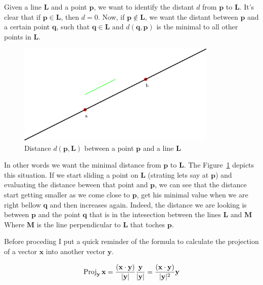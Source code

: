 Given a line $\mathbf{L}$ and a point $\mathbf{p}$, we want to identify the distant $d$ from $\mathbf{p}$ to $\mathbf{L}$.
It's clear that if $\mathbf{p} \in \mathbf{L}$, then $d = 0$.
Now, if $\mathbf{p} \notin \mathbf{L}$, we want the distant between $\mathbf{p}$ and a certain point $\mathbf{q}$, such that $\mathbf{q} \in \mathbf{L}$ and $d(\mathbf{q}, \mathbf{p})$ is the minimal to all other points in $\mathbf{L}$.

\begin{figure}[htb]
  \centering
  \includegraphics[width=0.85\textwidth]{img/line}
  \caption{Distance $d(\mathbf{p}, \mathbf{L})$ between a point $\mathbf{p}$ and a line $\mathbf{L}$}
  \label{fig:point2line}
\end{figure}

In other words we want the minimal distance from $\mathbf{p}$ to $\mathbf{L}$.
The Figure~\ref{fig:point2line} depicts this situation.
If we start sliding a point on $\mathbf{L}$ (strating lets say at $\mathbf{p}$) and evaluating the distance beween that point and $\mathbf{p}$, we can see that the distance start getting smaller as we come close to $\mathbf{p}$, get his minimal value when we are right bellow $\mathbf{q}$ and then increases again. 
Indeed, the distance we are looking is between $\mathbf{p}$ and the point $\mathbf{q}$ that is in the intesection between the lines $\mathbf{L}$ and $\mathbf{M}$
Where $\mathbf{M}$ is the line perpendicular to $\mathbf{L}$ that toches $\mathbf{p}$. 

Before proceding I put a quick reminder of the formula to calculate the projection of a vector $\mathbf{x}$ into another vector $\mathbf{y}$.

\begin{equation}
\operatorname{Proj}_{\mathbf{y}}\mathbf{x} = \dfrac{(\mathbf{x} \cdot \mathbf{y})}{|\mathbf{y}|} \dfrac{\mathbf{y}}{|\mathbf{y}|} = \dfrac{(\mathbf{x} \cdot \mathbf{y})}{|\mathbf{y}|^2}\mathbf{y}
\label{eq:proj}
\end{equation}

